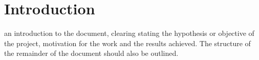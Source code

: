 \chapter{Introduction}
    an introduction to the document, clearing stating the hypothesis or objective of the project, motivation for the work and the results achieved. The structure of the remainder of the document should also be outlined.